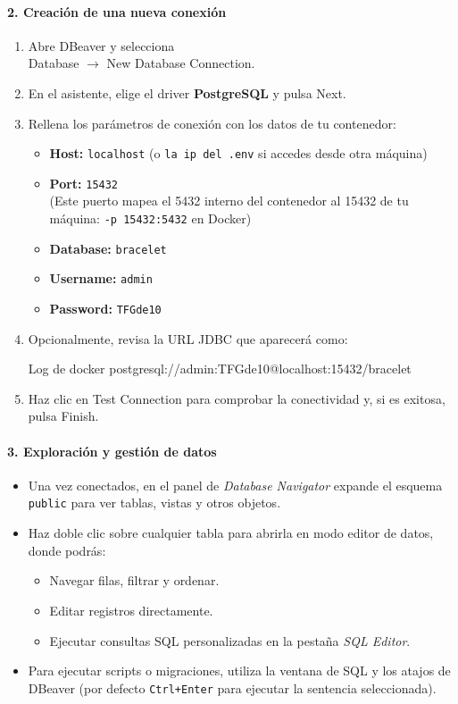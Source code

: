 \documentclass[12pt, a4paper]{article}
\begin{document}
\begin{umaappendices}
	\paragraph{2. Creación de una nueva conexión}  
	\begin{enumerate}
		\item Abre DBeaver y selecciona \\[4pt]
		\hspace*{1em}\textsf{Database} \(\to\) \textsf{New Database Connection}.
		\item En el asistente, elige el driver \textbf{PostgreSQL} y pulsa \textsf{Next}.
		\item Rellena los parámetros de conexión con los datos de tu contenedor:
		\begin{itemize}
			\item \textbf{Host:} \texttt{localhost} (o \texttt{la ip del .env} si accedes desde otra máquina)
			\item \textbf{Port:} \texttt{15432}\\
			(Este puerto mapea el 5432 interno del contenedor al 15432 de tu máquina: \texttt{-p 15432:5432} en Docker)
			\item \textbf{Database:} \texttt{bracelet}
			\item \textbf{Username:} \texttt{admin}
			\item \textbf{Password:} \texttt{TFGde10}
		\end{itemize}
		\item Opcionalmente, revisa la URL JDBC que aparecerá como:
		\begin{Terminal}{Log de docker}
			postgresql://admin:TFGde10@localhost:15432/bracelet
		\end{Terminal}
		\item Haz clic en \textsf{Test Connection} para comprobar la conectividad y, si es exitosa, pulsa \textsf{Finish}.
	\end{enumerate}
	
	\paragraph{3. Exploración y gestión de datos}  
	\begin{itemize}
		\item Una vez conectados, en el panel de \emph{Database Navigator} expande el esquema \texttt{public} para ver tablas, vistas y otros objetos.
		\item Haz doble clic sobre cualquier tabla para abrirla en modo editor de datos, donde podrás:
		\begin{itemize}
			\item Navegar filas, filtrar y ordenar.
			\item Editar registros directamente.
			\item Ejecutar consultas SQL personalizadas en la pestaña \emph{SQL Editor}.
		\end{itemize}
		\item Para ejecutar scripts o migraciones, utiliza la ventana de SQL y los atajos de DBeaver (por defecto \texttt{Ctrl+Enter} para ejecutar la sentencia seleccionada).
	\end{itemize}
	

\end{umaappendices}
\end{document}
